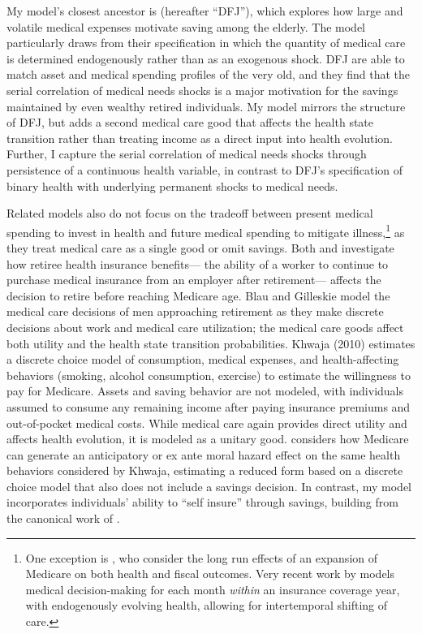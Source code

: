 \documentclass[12pt,pdftex,letterpaper]{article}
\begin{document}
My model's closest ancestor is \cite{dinardi10} (hereafter ``DFJ''), which explores how large and volatile medical expenses motivate saving among the elderly.  The model particularly draws from their specification in which the quantity of medical care is determined endogenously rather than as an exogenous shock.  DFJ are able to match asset and medical spending profiles of the very old, and they find that the serial correlation of medical needs shocks is a major motivation for the savings maintained by even wealthy retired individuals.  My model mirrors the structure of DFJ, but adds a second medical care good that affects the health state transition rather than treating income as a direct input into health evolution.  Further, I capture the serial correlation of medical needs shocks through persistence of a continuous health variable, in contrast to DFJ's specification of binary health with underlying permanent shocks to medical needs.

Related models also do not focus on the tradeoff between present medical spending to invest in health and future medical spending to mitigate illness,\footnote{One exception is \cite{yang08}, who consider the long run effects of an expansion of Medicare on both health and fiscal outcomes.  Very recent work by \cite{cronin16} models medical decision-making for each month \textit{within} an insurance coverage year, with endogenously evolving health, allowing for intertemporal shifting of care.} as they treat medical care as a single good or omit savings.  Both \cite{french11} and \cite{blau08} investigate how retiree health insurance benefits--- the ability of a worker to continue to purchase medical insurance from an employer after retirement--- affects the decision to retire before reaching Medicare age.  Blau and Gilleskie model the medical care decisions of men approaching retirement as they make discrete decisions about work and medical care utilization; the medical care goods affect both utility and the health state transition probabilities.  Khwaja (2010) estimates a discrete choice model of consumption, medical expenses, and health-affecting behaviors (smoking, alcohol consumption, exercise) to estimate the willingness to pay for Medicare.  Assets and saving behavior are not modeled, with individuals assumed to consume any remaining income after paying insurance premiums and out-of-pocket medical costs.  While medical care again provides direct utility and affects health evolution, it is modeled as a unitary good.  \cite{depreux11} considers how Medicare can generate an anticipatory or ex ante moral hazard effect on the same health behaviors considered by Khwaja, estimating a reduced form based on a discrete choice model that also does not include a savings decision.  In contrast, my model incorporates individuals' ability to ``self insure'' through savings, building from the canonical work of \cite{carroll97b}.
\end{document}
